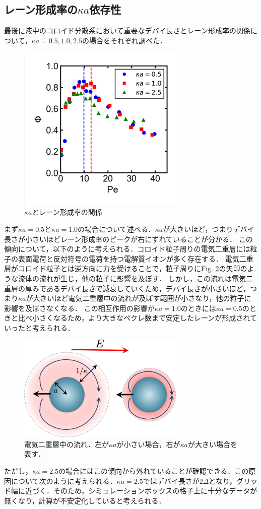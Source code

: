 \subsection{レーン形成率の$\kappa a$依存性}
%
最後に液中のコロイド分散系において重要なデバイ長さとレーン形成率の関係について，$\kappa a=0.5,1.0,2.5$の場合をそれぞれ調べた．
\begin{figure}[H]
\centering
\includegraphics[width=8.0cm]{figures/kaPe2.pdf}
\caption{$\kappa a$とレーン形成率の関係}
\label{kaPhi}
\end{figure}
まず$\kappa a=0.5$と$\kappa a=1.0$の場合について述べる．$\kappa a$が大きいほど，つまりデバイ長さが小さいほどレーン形成率のピークが右にずれていることが分かる．
この傾向について，以下のように考えられる．コロイド粒子周りの電気二重層には粒子の表面電荷と反対符号の電荷を持つ電解質イオンが多く存在する．
電気二重層がコロイド粒子とは逆方向に力を受けることで，粒子周りにFig. \ref{ka2}の矢印のような流体の流れが生じ，他の粒子に影響を及ぼす．
しかし，この流れは電気二重層の厚みであるデバイ長さで減衰していくため，デバイ長さが小さいほど，つまり$\kappa a$が大きいほど電気二重層中の流れが及ぼす範囲が小さなり，他の粒子に影響を及ぼさなくなる．
この相互作用の影響が$\kappa a=1.0$のときには$\kappa a=0.5$のときと比べ小さくなるため，より大きなペクレ数まで安定したレーンが形成されていったと考えられる．
\begin{figure}[H]
\centering
\includegraphics[width=8.0cm]{figures/ka2.pdf}
\caption{電気二重層中の流れ．左が$\kappa a$が小さい場合，右が$\kappa  a$が大きい場合を表す．}
\label{ka2}
\end{figure}
\noindent
ただし，$\kappa a=2.5$の場合にはこの傾向から外れていることが確認できる．この原因について次のように考えられる．$\kappa a=2.5$ではデバイ長さが$2\Delta$となり，グリッド幅に近づく．そのため，シミュレーションボックスの格子上に十分なデータが無くなり，計算が不安定化していると考えられる．
%
%
%
%
%
%
%
%
%
%
%
%
%
%
%
